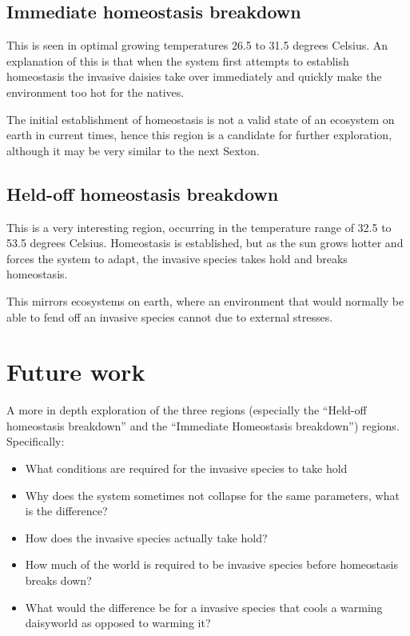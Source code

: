 \documentclass[12pt]{article}
\begin{document}
\subsection{Immediate homeostasis breakdown}
This is seen in optimal growing temperatures 26.5 to 31.5 degrees
Celsius. An explanation of this is that when the system first attempts
to establish homeostasis the invasive daisies take over immediately
and quickly make the environment too hot for the natives.

The initial establishment of homeostasis is not a valid state of an
ecosystem on earth in current times, hence this region is a candidate
for further exploration, although it may be very similar to the next Sexton.

\subsection{Held-off homeostasis breakdown}
This is a very interesting region, occurring in the temperature range
of 32.5 to 53.5 degrees Celsius. Homeostasis is established, but as
the sun grows hotter and forces the system to adapt, the invasive
species takes hold and breaks homeostasis.

This mirrors ecosystems on earth, where an environment that would
normally be able to fend off an invasive species cannot due to
external stresses\cite{albert2000}.

\section{Future work}
A more in depth exploration of the three regions (especially the
``Held-off homeostasis breakdown'' and the ``Immediate Homeostasis
breakdown'') regions. Specifically:
\begin{itemize}
\item What conditions are required for the invasive species to take hold
\item Why does the system sometimes not collapse for the same
  parameters, what is the difference?
\item How does the invasive species actually take hold?
\item How much of the world is required to be invasive species before
  homeostasis breaks down?
\item What would the difference be for a invasive species that cools a
  warming daisyworld as opposed to warming it?
\end{itemize}
\end{document}
